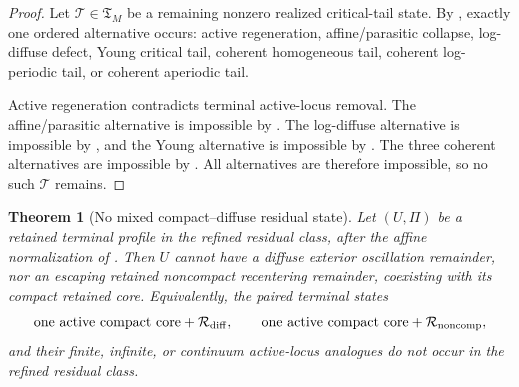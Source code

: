 \documentclass[11pt]{amsart}
\numberwithin{equation}{section}
\theoremstyle{plain}
\newtheorem{theorem}{Theorem}[section]
\theoremstyle{definition}
\theoremstyle{remark}
\newcommand{\Tcrit}{\mathfrak T_M}
\begin{document}
\begin{proof}
Let \(\mathcal T\in\Tcrit\) be a remaining nonzero realized critical-tail state.
By , exactly one ordered alternative
occurs: active regeneration, affine/parasitic collapse, log-diffuse defect,
Young critical tail, coherent homogeneous tail, coherent log-periodic tail, or
coherent aperiodic tail.

Active regeneration contradicts terminal active-locus removal.  The
affine/parasitic alternative is impossible by
.  The log-diffuse alternative is
impossible by , and the Young
alternative is impossible by .  The three coherent alternatives are impossible by
.  All alternatives are
therefore impossible, so no such \(\mathcal T\) remains.
\end{proof}

\begin{theorem}[No mixed compact--diffuse residual state]
\label{thm:no-mixed-compact-diffuse}
Let \((U,\Pi)\) be a retained terminal profile in the refined residual class,
after the affine normalization of .
Then \(U\) cannot have a diffuse exterior oscillation remainder, nor an escaping retained noncompact
recentering remainder, coexisting with its compact retained core.  Equivalently,
the paired terminal states
\[
   \hbox{one active compact core}+\mathcal R_{\rm diff},
   \qquad
   \hbox{one active compact core}+\mathcal R_{\rm noncomp},
\]
and their finite, infinite, or continuum active-locus analogues do not occur in
the refined residual class.
\end{theorem}
\end{document}
